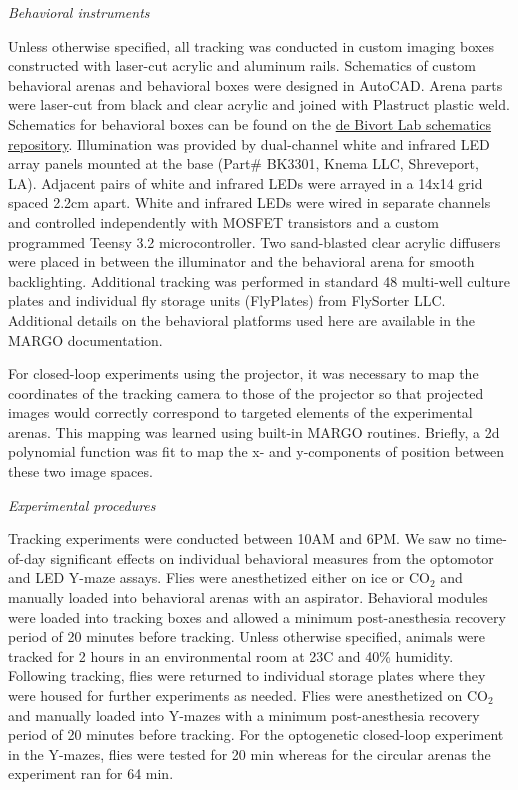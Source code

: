 \documentclass[10pt]{article}
\begin{document}
\begin{multicols}{2}
\vspace*{0.5cm}
\noindent\textit{Behavioral instruments}
\vspace*{0.3cm}

Unless otherwise specified, all tracking was conducted in custom imaging boxes constructed with laser-cut acrylic and aluminum rails. Schematics of custom behavioral arenas and behavioral boxes were designed in AutoCAD. Arena parts were laser-cut from black and clear acrylic and joined with Plastruct plastic weld. Schematics for behavioral boxes can be found on the \href{https://github.com/de-Bivort-Lab/dblab-schematics}{de Bivort Lab schematics repository}. Illumination was provided by dual-channel white and infrared LED array panels mounted at the base (Part# BK3301, Knema LLC, Shreveport, LA). Adjacent pairs of white and infrared LEDs were arrayed in a 14x14 grid spaced 2.2cm apart. White and infrared LEDs were wired in separate channels and controlled independently with MOSFET transistors and a custom programmed Teensy 3.2 microcontroller. Two sand-blasted clear acrylic diffusers were placed in between the illuminator and the behavioral arena for smooth backlighting. Additional tracking was performed in standard 48 multi-well culture plates and individual fly storage units (FlyPlates) from FlySorter LLC. Additional details on the behavioral platforms used here are available in the MARGO documentation.

For closed-loop experiments using the projector, it was necessary to map the coordinates of the tracking camera to those of the projector so that projected images would correctly correspond to targeted elements of the experimental arenas. This mapping was learned using built-in MARGO routines. Briefly, a 2d polynomial function was fit to map the x- and y-components of position between these two image spaces.

\vspace*{0.5cm}
\noindent\textit{Experimental procedures}
\vspace*{0.3cm}

Tracking experiments were conducted between 10AM and 6PM. We saw no time-of-day significant effects on individual behavioral measures from the optomotor and LED Y-maze assays. Flies were anesthetized either on ice or CO$_{2}$ and manually loaded into behavioral arenas with an aspirator. Behavioral modules were loaded into tracking boxes and allowed a minimum post-anesthesia recovery period of 20 minutes before tracking. Unless otherwise specified, animals were tracked for 2 hours in an environmental room at 23\degree C and 40\% humidity. Following tracking, flies were returned to individual storage plates where they were housed for further experiments as needed. Flies were anesthetized on CO$_{2}$ and manually loaded into Y-mazes with a minimum post-anesthesia recovery period of 20 minutes before tracking. For the optogenetic closed-loop experiment in the Y-mazes, flies were tested for 20 min whereas for the circular arenas the experiment ran for 64 min.


\end{multicols}
\end{document}
